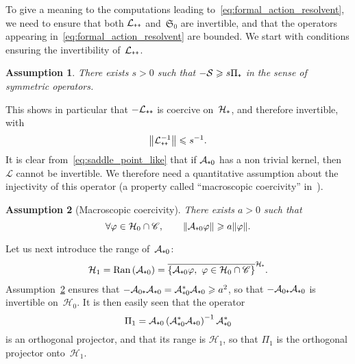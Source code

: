 \documentclass{article}
\newtheorem{assumption}{Assumption}
\newcommand{\cL}{\mathcal{L}}
\newcommand{\cLs}{\mathcal{S}}
\newcommand{\cLa}{\mathcal{A}}
\newcommand{\Schur}{\mathfrak{S}_0}
\newcommand{\cH}{\mathcal{H}}
\newcommand{\subplus}{\textnormal{\texttt{+}}}
\renewcommand{\leq}{\leqslant}
\renewcommand{\geq}{\geqslant}
\renewcommand{\ge}{\geqslant}
\begin{document}
To give a meaning to the computations leading to~\eqref{eq:formal_action_resolvent}, we need to ensure that both $\cL_{\subplus\subplus}$ and~$\Schur$ are invertible, and that the operators appearing in~\eqref{eq:formal_action_resolvent} are bounded. We start with conditions ensuring the invertibility of~$\cL_{\subplus\subplus}$.
\begin{assumption}
  \label{ass:A_inv}
  There exists $s > 0$ such that $-\cLs \ge s \Pi_{\subplus}$ in the sense of symmetric operators.
\end{assumption}
This shows in particular that $-\cL_{\subplus\subplus}$ is coercive on~$\cH_\subplus$, and therefore invertible, with
\begin{align*}
  \left\| \cL_{\subplus\subplus}^{-1} \right\| \leq s^{-1}.
\end{align*}
It is clear from~\eqref{eq:saddle_point_like} that if $\cLa_{\subplus0}$ has a non trivial kernel, then $\cL$ cannot be invertible. We therefore need a quantitative assumption about the injectivity of this operator (a property called ``macroscopic coercivity'' in~\cite{DMS15}).
\begin{assumption}[Macroscopic coercivity]
  \label{ass:macro_coercivity}
  There exists $a > 0$ such that
  \begin{equation}
    \label{eq:macro_coercivity_bound}
    \forall \varphi \in \cH_{0} \cap \mathscr{C}, \qquad \|\cLa_{\subplus0} \varphi\| \geq a \|\varphi\|.
  \end{equation}
\end{assumption}

Let us next introduce the range of~$\cLa_{\subplus 0}$:
\begin{align*}
  \cH_{1} = \mathrm{Ran}\left(\cLa_{\subplus 0}\right) = \overline{\{\cLa_{\subplus0} \varphi, \ \varphi \in \cH_{0} \cap \mathscr{C} \}}^{\cH_{\subplus}}.
\end{align*}
Assumption~\ref{ass:macro_coercivity} ensures that $-\cLa_{0\subplus} \cLa_{\subplus0} = \cLa_{\subplus0}^{*} \cLa_{\subplus0} \geq a^2$, so that $-\cLa_{0\subplus} \cLa_{\subplus0}$ is invertible on~$\cH_{0}$. It is then easily seen that the operator
\begin{equation}
  \label{eq:Pi_1}
  \Pi_{1} = \cLa_{\subplus0} \left(\cLa_{\subplus0}^*\cLa_{\subplus0}\right)^{-1} \cLa_{\subplus0}^*
\end{equation}
is an orthogonal projector, and that its range is $\cH_{1}$, so that $\Pi_{1}$ is the orthogonal projector onto~$\cH_{1}$.
\end{document}

